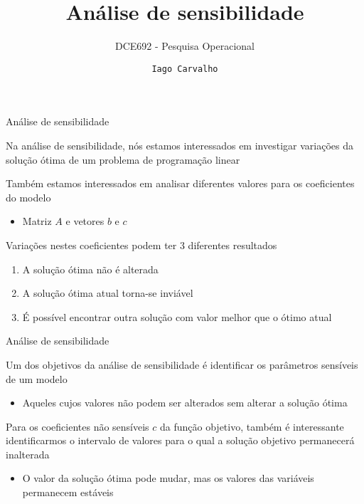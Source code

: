 \documentclass[compress,mathserif]{beamer}
\title{Análise de sensibilidade}
\subtitle{DCE692 - Pesquisa Operacional}
\author{\texttt{Iago Carvalho}}
\institute{\texttt{Departamento de Ciência da Computação}}
\begin{document}
\begin{frame}
\titlepage

\end{frame}


\begin{frame}{Análise de sensibilidade}
 
Na análise de sensibilidade, nós estamos interessados em investigar variações da solução ótima de um problema de programação linear

\vspace{0.5cm}

Também estamos interessados em analisar diferentes valores para os coeficientes do modelo
\begin{itemize}
    \item Matriz $A$ e vetores $b$ e $c$
\end{itemize}

\vspace{0.5cm}

Variações nestes coeficientes podem ter 3 diferentes resultados
\begin{enumerate}
    \item A solução ótima não é alterada
    \item A solução ótima atual torna-se inviável
    \item É possível encontrar outra solução com valor melhor que o ótimo atual
\end{enumerate}

\end{frame}


\begin{frame}{Análise de sensibilidade}

Um dos objetivos da análise de sensibilidade é identificar os parâmetros sensíveis de um modelo
\begin{itemize}
    \item Aqueles cujos valores não podem ser alterados sem alterar a solução ótima
\end{itemize}

\vspace{0.5cm}

Para os coeficientes não sensíveis $c$ da função objetivo, também é interessante identificarmos o intervalo de valores para o qual a solução objetivo permanecerá inalterada
\begin{itemize}
    \item O valor da solução ótima pode mudar, mas os valores das variáveis permanecem estáveis
\end{itemize}
\end{frame}
\end{document}

